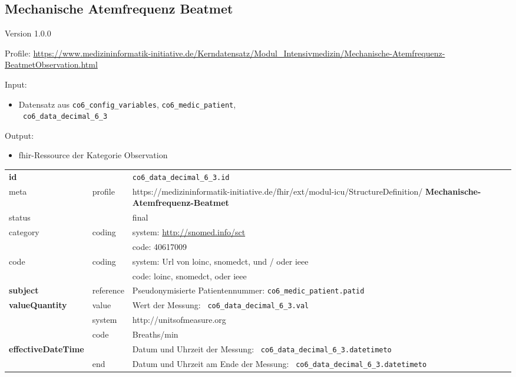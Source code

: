 \subsection{Mechanische Atemfrequenz Beatmet} 
\noindent Version 1.0.0

\noindent Profile: \url{https://www.medizininformatik-initiative.de/Kerndatensatz/Modul_Intensivmedizin/Mechanische-Atemfrequenz-BeatmetObservation.html}

\noindent Input:

\begin{itemize}
	\item Datensatz aus \texttt{co6\_config\_variables}, \texttt{co6\_medic\_patient}, \\ \texttt{
co6\_data\_decimal\_6\_3}
\end{itemize}
Output:
\begin{itemize}
        \item \ac{fhir}-Ressource der Kategorie \glqq Observation\grqq{}
\end{itemize}
\begin{longtable}{|l|l|p{7.5cm}|}
        \hline
        \rowcolor{lightgray} \multicolumn{3}{|l|}{Data Mapping (inhaltlich)} \\ \hline
        \textbf{id} &  & \texttt{co6\_data\_decimal\_6\_3.id} \\ \hline
	meta & profile & https://medizininformatik-initiative.de/fhir/ext/modul-icu/StructureDefinition/\textbf{
Mechanische-Atemfrequenz-Beatmet} \\ \hline 
	status &  & final   \\ \hline 
	category & coding & system: \url{http://snomed.info/sct} \\
\cline{3-3}
	& & code: 40617009 \\ \hline
	code & coding & system: Url von \ac{loinc}, \ac{snomedct}, und / oder \ac{ieee} \\ 
	\cline{3-3} 
	 &  & code: \ac{loinc}, \ac{snomedct}, oder \ac{ieee} \\ \hline
	 \textbf{subject}  & reference & Pseudonymisierte Patientennummer: \texttt{co6\_medic\_patient.patid} \\ \hline
	 \textbf{valueQuantity}  & value & Wert der Messung: \texttt{
co6\_data\_decimal\_6\_3.val} \\
        \cline{2-3}
         & system & http://unitsofmeasure.org \\
         \cline{2-3}
         & code & {Breaths}/min \\ \hline
     \textbf{effectiveDateTime}  & & Datum und Uhrzeit der Messung: \texttt{
co6\_data\_decimal\_6\_3.datetimeto} \\
    \cline{2-3}
     & end & Datum und Uhrzeit am Ende der Messung: \texttt{
co6\_data\_decimal\_6\_3.datetimeto} \\ \hline
\end{longtable}


